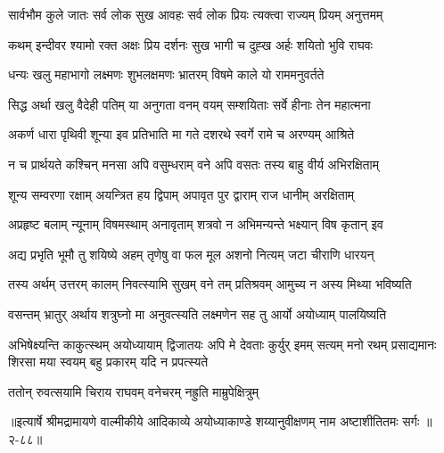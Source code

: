 \twolineshloka
{सार्वभौम कुले जातः सर्व लोक सुख आवहः}
{सर्व लोक प्रियः त्यक्त्वा राज्यम् प्रियम् अनुत्तमम्} %

\twolineshloka
{कथम् इन्दीवर श्यामो रक्त अक्षः प्रिय दर्शनः}
{सुख भागी च दुह्ख अर्हः शयितो भुवि राघवः} %

\twolineshloka
{धन्यः खलु महाभागो लक्ष्मणः शुभलक्षमणः}
{भ्रातरम् विषमे काले यो राममनुवर्तते} %

\twolineshloka
{सिद्ध अर्था खलु वैदेही पतिम् या अनुगता वनम्}
{वयम् सम्शयिताः सर्वे हीनाः तेन महात्मना} %

\twolineshloka
{अकर्ण धारा पृथिवी शून्या इव प्रतिभाति मा}
{गते दशरथे स्वर्गे रामे च अरण्यम् आश्रिते} %

\twolineshloka
{न च प्रार्थयते कश्चिन् मनसा अपि वसुम्धराम्}
{वने अपि वसतः तस्य बाहु वीर्य अभिरक्षिताम्} %

\twolineshloka
{शून्य सम्वरणा रक्षाम् अयन्त्रित हय द्विपाम्}
{अपावृत पुर द्वाराम् राज धानीम् अरक्षिताम्} %

\twolineshloka
{अप्रहृष्ट बलाम् न्यूनाम् विषमस्थाम् अनावृताम्}
{शत्रवो न अभिमन्यन्ते भक्ष्यान् विष कृतान् इव} %

\twolineshloka
{अद्य प्रभृति भूमौ तु शयिष्ये अहम् तृणेषु वा}
{फल मूल अशनो नित्यम् जटा चीराणि धारयन्} %

\twolineshloka
{तस्य अर्थम् उत्तरम् कालम् निवत्स्यामि सुखम् वने}
{तम् प्रतिश्रवम् आमुच्य न अस्य मिथ्या भविष्यति} %

\twolineshloka
{वसन्तम् भ्रातुर् अर्थाय शत्रुघ्नो मा अनुवत्स्यति}
{लक्ष्मणेन सह तु आर्यो अयोध्याम् पालयिष्यति} %

\fourlineindentedshloka
{अभिषेक्ष्यन्ति काकुत्स्थम् अयोध्यायाम् द्विजातयः}
{अपि मे देवताः कुर्युर् इमम् सत्यम् मनो रथम्}
{प्रसाद्यमानः शिरसा मया स्वयम्}
{बहु प्रकारम् यदि न प्रपत्स्यते} %

\twolineshloka
{ततोन् रुवत्सयामि चिराय राघवम्}
{वनेचरम् नह्रुति माम्रुपेक्षित्रुम्} %


॥इत्यार्षे श्रीमद्रामायणे वाल्मीकीये आदिकाव्ये अयोध्याकाण्डे शय्यानुवीक्षणम् नाम अष्टाशीतितमः सर्गः ॥२-८८॥
